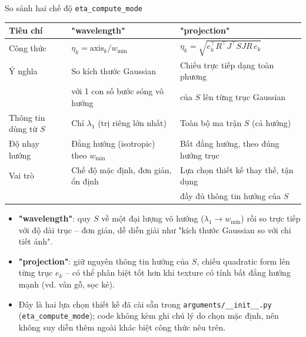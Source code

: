 \begin{frame}{So sánh hai chế độ \texttt{eta\_compute\_mode}}
\footnotesize
\centering
\begin{tabular}{lll}
\toprule
\textbf{Tiêu chí} & \textbf{"wavelength"} & \textbf{"projection"} \\
\midrule
Công thức & $\eta_k = \text{axis}_k / w_{\min}$ & $\eta_k = \sqrt{e_k^\top R^\top J^\top S J R\, e_k}$ \\
Ý nghĩa & So kích thước Gaussian & Chiếu trực tiếp dạng toàn phương \\
 & với 1 con số bước sóng vô hướng & của $S$ lên từng trục Gaussian \\
Thông tin dùng từ $S$ & Chỉ $\lambda_1$ (trị riêng lớn nhất) & Toàn bộ ma trận $S$ (cả hướng) \\
Độ nhạy hướng & Đẳng hướng (isotropic) theo $w_{\min}$ & Bất đẳng hướng, theo đúng hướng trục \\
Vai trò & Chế độ mặc định, đơn giản, ổn định & Lựa chọn thiết kế thay thế, tận dụng \\
 & & đầy đủ thông tin hướng của $S$ \\
\bottomrule
\end{tabular}
\vspace{0.3cm}
\begin{itemize}
    \item \textbf{"wavelength"}: quy $S$ về một đại lượng vô hướng ($\lambda_1 \to w_{\min}$) rồi so trực tiếp với độ dài trục -- đơn giản, dễ diễn giải như "kích thước Gaussian so với chi tiết ảnh".
    \item \textbf{"projection"}: giữ nguyên thông tin hướng của $S$, chiếu quadratic form lên từng trục $e_k$ -- có thể phân biệt tốt hơn khi texture có tính bất đẳng hướng mạnh (vd. vân gỗ, sọc kẻ).
    \item Đây là hai lựa chọn thiết kế đã cài sẵn trong \texttt{arguments/\_\_init\_\_.py} (\texttt{eta\_compute\_mode}); code không kèm ghi chú lý do chọn mặc định, nên không suy diễn thêm ngoài khác biệt công thức nêu trên.
\end{itemize}
\end{frame}

